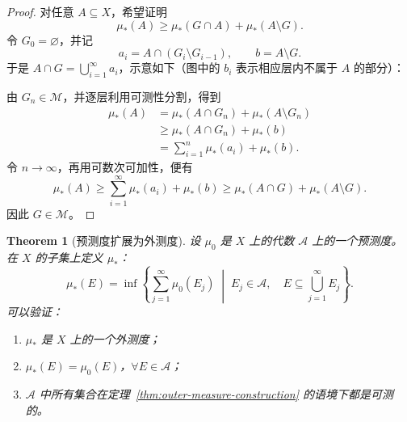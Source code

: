 \documentclass[12pt,letterpaper,twoside,openright]{ctexbook}
\theoremstyle{bluehead}
\newtheorem{theorem}{Theorem}
\theoremstyle{olivehead}
\theoremstyle{orangehead}
\theoremstyle{redremark}
\begin{document}
\begin{proof}
对任意 $A\subseteq X$，希望证明
\[
  \mu_*(A)\geq\mu_*(G\cap A)+\mu_*(A\setminus G).
\]
令 $G_0=\varnothing$，并记
\[
  a_i=A\cap(G_i\setminus G_{i-1}),\qquad b=A\setminus G.
\]
于是 $A\cap G=\bigcup_{i=1}^{\infty}a_i$，示意如下（图中的 $b_i$ 表示相应层内不属于 $A$ 的部分）：
\begin{center}
\end{center}
由 $G_n\in\mathcal{M}$，并逐层利用可测性分割，得到
\[
\begin{aligned}
  \mu_*(A)
  &=\mu_*(A\cap G_n)+\mu_*(A\setminus G_n)\\
  &\geq\mu_*(A\cap G_n)+\mu_*(b)\\
  &=\sum_{i=1}^{n}\mu_*(a_i)+\mu_*(b).
\end{aligned}
\]
令 $n\to\infty$，再用可数次可加性，便有
\[
  \mu_*(A)\geq\sum_{i=1}^{\infty}\mu_*(a_i)+\mu_*(b)
  \geq\mu_*(A\cap G)+\mu_*(A\setminus G).
\]
因此 $G\in\mathcal{M}$。
\end{proof}
\begin{theorem}[预测度扩展为外测度]
设 $\mu_0$ 是 $X$ 上的代数 $\mathcal{A}$ 上的一个预测度。在 $X$ 的子集上定义 $\mu_*$：
\[
  \mu_*(E)=\inf\left\{
    \sum_{j=1}^{\infty}\mu_0(E_j)\;\middle|\;
    E_j\in\mathcal{A},\quad E\subseteq\bigcup_{j=1}^{\infty}E_j
  \right\}.
\]
可以验证：
\begin{enumerate}
  \item $\mu_*$ 是 $X$ 上的一个外测度；
  \item $\mu_*(E)=\mu_0(E)$，$\forall E\in\mathcal{A}$；
  \item $\mathcal{A}$ 中所有集合在定理~\ref{thm:outer-measure-construction} 的语境下都是可测的。
\end{enumerate}
\end{theorem}
\end{document}
